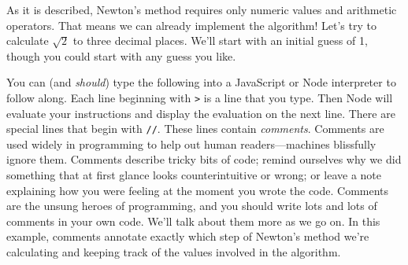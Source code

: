 As it is described, Newton's method requires only numeric values and arithmetic operators. That means we can already implement the algorithm! Let's try to calculate $\sqrt{2}$ to three decimal places. We'll start with an initial guess of 1, though you could start with any guess you like.

You can (and \emph{should}) type the following into a JavaScript or Node interpreter to follow along. Each line beginning with \texttt{>} is a line that you type. Then Node will evaluate your instructions and display the evaluation on the next line. There are special lines that begin with \texttt{//}. These lines contain \emph{comments}. Comments are used widely in programming to help out human readers---machines blissfully ignore them. Comments describe tricky bits of code; remind ourselves why we did something that at first glance looks counterintuitive or wrong; or leave a note explaining how you were feeling at the moment you wrote the code. Comments are the unsung heroes of programming, and you should write lots and lots of comments in your own code. We'll talk about them more as we go on. In this example, comments annotate exactly which step of Newton's method we're calculating and keeping track of the values involved in the algorithm.

